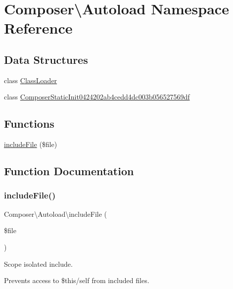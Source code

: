 \hypertarget{namespace_composer_1_1_autoload}{}\section{Composer\textbackslash{}Autoload Namespace Reference}
\label{namespace_composer_1_1_autoload}
\subsection*{Data Structures}
\begin{DoxyCompactItemize}
\item 
class \mbox{\hyperlink{class_composer_1_1_autoload_1_1_class_loader}{Class\+Loader}}
\item 
class \mbox{\hyperlink{class_composer_1_1_autoload_1_1_composer_static_init0424202ab4cedd4dc003b056527569df}{Composer\+Static\+Init0424202ab4cedd4dc003b056527569df}}
\end{DoxyCompactItemize}
\subsection*{Functions}
\begin{DoxyCompactItemize}
\item 
\mbox{\hyperlink{namespace_composer_1_1_autoload_a578ac7c710d884fb0ec5a8e6fd14d79f}{include\+File}} (\$file)
\end{DoxyCompactItemize}


\subsection{Function Documentation}
\mbox{\label{namespace_composer_1_1_autoload_a578ac7c710d884fb0ec5a8e6fd14d79f}} 
\subsubsection{\texorpdfstring{include\+File()}{includeFile()}}
{\footnotesize\ttfamily Composer\textbackslash{}\+Autoload\textbackslash{}include\+File (\begin{DoxyParamCaption}\item[{}]{\$file }\end{DoxyParamCaption})}

Scope isolated include.

Prevents access to \$this/self from included files. 